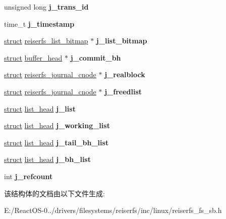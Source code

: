 \begin{DoxyCompactItemize}
unsigned long {\bfseries j\+\_\+trans\+\_\+id}
\item 
\mbox{\label{structreiserfs__journal__list_ae7e1268a246897c28cee1fedd0a5c0e6}} 
time\+\_\+t {\bfseries j\+\_\+timestamp}
\item 
\mbox{\label{structreiserfs__journal__list_af611117da1d5c5cf104964b70b62ec3d}} 
\hyperlink{interfacestruct}{struct} \hyperlink{structreiserfs__list__bitmap}{reiserfs\+\_\+list\+\_\+bitmap} $\ast$ {\bfseries j\+\_\+list\+\_\+bitmap}
\item 
\mbox{\label{structreiserfs__journal__list_a5a18f4b4da8602337da5430db90e70e7}} 
\hyperlink{interfacestruct}{struct} \hyperlink{structbuffer__head}{buffer\+\_\+head} $\ast$ {\bfseries j\+\_\+commit\+\_\+bh}
\item 
\mbox{\label{structreiserfs__journal__list_a9f9936a49219dd995413557fc4c8ba84}} 
\hyperlink{interfacestruct}{struct} \hyperlink{structreiserfs__journal__cnode}{reiserfs\+\_\+journal\+\_\+cnode} $\ast$ {\bfseries j\+\_\+realblock}
\item 
\mbox{\label{structreiserfs__journal__list_a4446bca167e181dd29da7b7b6c94f3f2}} 
\hyperlink{interfacestruct}{struct} \hyperlink{structreiserfs__journal__cnode}{reiserfs\+\_\+journal\+\_\+cnode} $\ast$ {\bfseries j\+\_\+freedlist}
\item 
\mbox{\label{structreiserfs__journal__list_a74ce64d3eb9b8f24fcf5fd80658516dc}} 
\hyperlink{interfacestruct}{struct} \hyperlink{structlist__head}{list\+\_\+head} {\bfseries j\+\_\+list}
\item 
\mbox{\label{structreiserfs__journal__list_a20fab3a4749310046904c518c59a8b30}} 
\hyperlink{interfacestruct}{struct} \hyperlink{structlist__head}{list\+\_\+head} {\bfseries j\+\_\+working\+\_\+list}
\item 
\mbox{\label{structreiserfs__journal__list_a0ba65f7e788fe32d7b1f790071ae87d4}} 
\hyperlink{interfacestruct}{struct} \hyperlink{structlist__head}{list\+\_\+head} {\bfseries j\+\_\+tail\+\_\+bh\+\_\+list}
\item 
\mbox{\label{structreiserfs__journal__list_a100babae1d479c534fed2d3d33d677f4}} 
\hyperlink{interfacestruct}{struct} \hyperlink{structlist__head}{list\+\_\+head} {\bfseries j\+\_\+bh\+\_\+list}
\item 
\mbox{\label{structreiserfs__journal__list_a33610a5057e3f04d7847ef191db2b649}} 
int {\bfseries j\+\_\+refcount}
\end{DoxyCompactItemize}


该结构体的文档由以下文件生成\+:\begin{DoxyCompactItemize}
\item 
E\+:/\+React\+O\+S-\/0../drivers/filesystems/reiserfs/inc/linux/reiserfs\+\_\+fs\+\_\+sb.\+h\end{DoxyCompactItemize}
